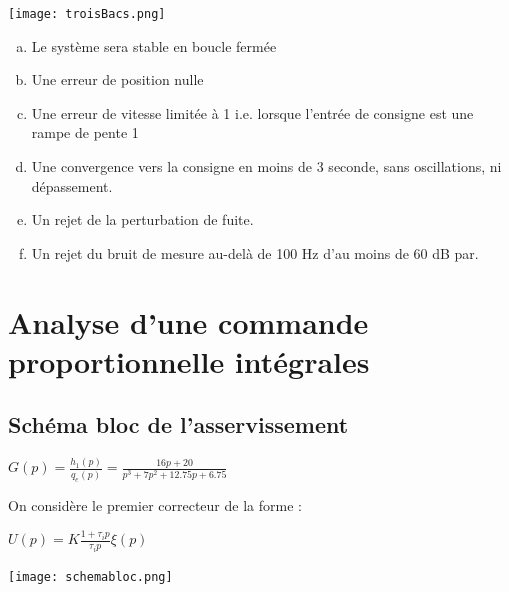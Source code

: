 \documentclass[12pt, a4paper, openany]{report}
\begin{document}
\begin{center}
    \texttt{[image: troisBacs.png]}
    \label{fig1}
    \end{center}





 \begin{enumerate}[(a)]
   \item Le système sera stable en boucle fermée
   \item Une erreur de position nulle
   \item Une erreur de vitesse limitée à 1 i.e. lorsque l'entrée de consigne est une rampe de pente 1
   \item Une convergence vers la consigne en moins de 3 seconde, sans oscillations, ni dépassement.
   \item Un rejet de la perturbation de fuite.
   \item Un rejet du bruit de mesure au-delà de 100 Hz d’au moins de 60 dB par.
 \end{enumerate}
	
\chapter{ Analyse d'une commande proportionnelle intégrales}
 
 \section{Schéma bloc de l'asservissement}  %
   
   
   \begin{center}
   $G(p)=\frac {h_{1}(p)}{q_{e}(p)}=\frac{16p+20}{p^{3}+7p^{2}+12.75p+6.75}$   
   \end{center}
   
   On considère le premier correcteur de la forme : \\
   \begin{center}
   $U(p)=K\frac {1+\tau_{i}p}{\tau_{i}p}\xi(p)$ 
   \\[2cm]  
   \end{center}  
   
   \begin{center}
    \texttt{[image: schemabloc.png]}
    \label{fig2}
   \end{center}
  
\end{document}

